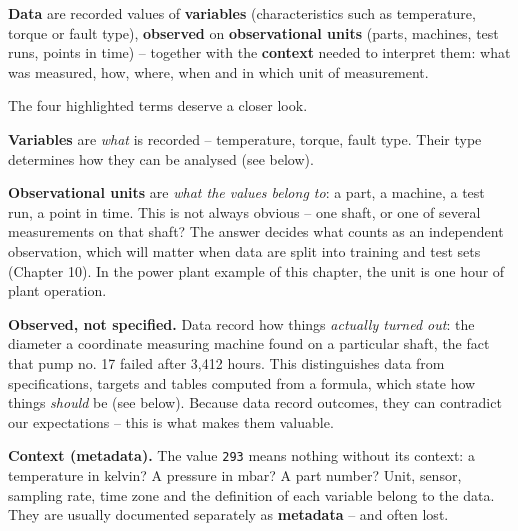 \documentclass[
  letterpaper,
  DIV=11,
  numbers=noendperiod]{scrreprt}
\begin{document}
\begin{tcolorbox}[enhanced jigsaw, left=2mm, title=\textcolor{quarto-callout-note-color}{\faInfo}\hspace{0.5em}{Definition: Data}, opacityback=0, breakable, rightrule=.15mm, arc=.35mm, toptitle=1mm, colbacktitle=quarto-callout-note-color!10!white, opacitybacktitle=0.6, coltitle=black, colframe=quarto-callout-note-color-frame, bottomrule=.15mm, leftrule=.75mm, bottomtitle=1mm, titlerule=0mm, toprule=.15mm, colback=white]

\textbf{Data} are recorded values of \textbf{variables} (characteristics
such as temperature, torque or fault type), \textbf{observed} on
\textbf{observational units} (parts, machines, test runs, points in
time) -- together with the \textbf{context} needed to interpret them:
what was measured, how, where, when and in which unit of measurement.

\end{tcolorbox}

The four highlighted terms deserve a closer look.

\textbf{Variables} are \emph{what} is recorded -- temperature, torque,
fault type. Their type determines how they can be analysed (see below).

\textbf{Observational units} are \emph{what the values belong to}: a
part, a machine, a test run, a point in time. This is not always obvious
-- one shaft, or one of several measurements on that shaft? The answer
decides what counts as an independent observation, which will matter
when data are split into training and test sets (Chapter 10). In the
power plant example of this chapter, the unit is one hour of plant
operation.

\textbf{Observed, not specified.} Data record how things \emph{actually
turned out}: the diameter a coordinate measuring machine found on a
particular shaft, the fact that pump no. 17 failed after 3,412 hours.
This distinguishes data from specifications, targets and tables computed
from a formula, which state how things \emph{should} be (see below).
Because data record outcomes, they can contradict our expectations --
this is what makes them valuable.

\textbf{Context (metadata).} The value \texttt{293} means nothing
without its context: a temperature in kelvin? A pressure in mbar? A part
number? Unit, sensor, sampling rate, time zone and the definition of
each variable belong to the data. They are usually documented separately
as \textbf{metadata} -- and often lost.
\end{document}
